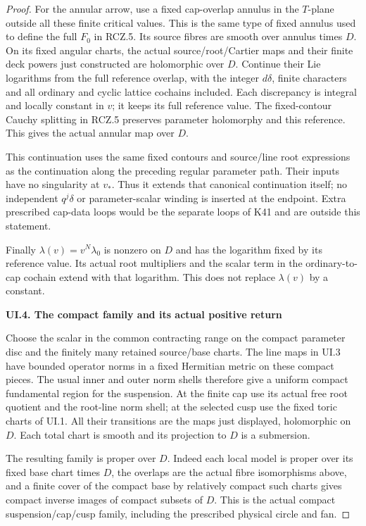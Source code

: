 \begin{proof}
For the annular arrow, use a fixed cap-overlap annulus in the
\(T\)-plane outside all these finite critical values. This is
the same type of fixed annulus used to define the full \(F_0\)
in RCZ.5. Its source fibres are smooth over annulus times \(D\).
On its fixed angular charts, the actual source/root/Cartier
maps and their finite deck powers just constructed are
holomorphic over \(D\). Continue their Lie logarithms from
the full reference overlap, with the integer \(d\delta\),
finite characters and all ordinary and cyclic lattice
cochains included. Each discrepancy is integral and locally
constant in \(v\); it keeps its full reference value. The
fixed-contour Cauchy splitting in RCZ.5 preserves parameter
holomorphy and this reference. This gives the actual annular
map over \(D\).

This continuation uses the same fixed contours and source/line
root expressions as the continuation along the preceding
regular parameter path. Their inputs have no singularity at
\(v_*\). Thus it extends that canonical continuation itself;
no independent \(q^j\delta\) or parameter-scalar winding is
inserted at the endpoint. Extra prescribed cap-data loops
would be the separate loops of K41 and are outside this
statement.

Finally \(\lambda(v)=v^N\lambda_0\) is nonzero on \(D\) and
has the logarithm fixed by its reference value. Its actual
root multipliers and the scalar term in the ordinary-to-cap
cochain extend with that logarithm. This does not replace
\(\lambda(v)\) by a constant.

\par

\medskip\noindent\textbf{UI.4. The compact family and its actual positive return}

\par\nobreak

Choose the scalar in the common contracting range on the compact
parameter disc and the finitely many retained source/base charts.
The line maps in UI.3 have bounded operator norms in a fixed
Hermitian metric on these compact pieces. The usual inner and
outer norm shells therefore give a uniform compact fundamental
region for the suspension. At the finite cap use its actual free
root quotient and the root-line norm shell; at the selected cusp
use the fixed toric charts of UI.1. All their transitions are
the maps just displayed, holomorphic on \(D\). Each total chart
is smooth and its projection to \(D\) is a submersion.

The resulting family is proper over \(D\). Indeed each local
model is proper over its fixed base chart times \(D\), the
overlaps are the actual fibre isomorphisms above, and a finite
cover of the compact base by relatively compact such charts
gives compact inverse images of compact subsets of \(D\).
This is the actual compact suspension/cap/cusp family, including
the prescribed physical circle and fan.


\end{proof}
